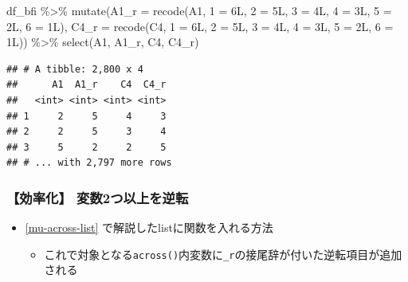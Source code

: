 \documentclass[
  xelatex,ja=standard, b5paper]{bxjsbook}
\newenvironment{Shaded}{\begin{snugshade}}{\end{snugshade}}
\newcommand{\AttributeTok}[1]{\textcolor[rgb]{0.77,0.63,0.00}{#1}}
\newcommand{\FunctionTok}[1]{\textcolor[rgb]{0.00,0.00,0.00}{#1}}
\newcommand{\NormalTok}[1]{#1}
\newcommand{\OtherTok}[1]{\textcolor[rgb]{0.56,0.35,0.01}{#1}}
\newcommand{\SpecialCharTok}[1]{\textcolor[rgb]{0.00,0.00,0.00}{#1}}
\newcommand{\StringTok}[1]{\textcolor[rgb]{0.31,0.60,0.02}{#1}}
\providecommand{\tightlist}{%
  \setlength{\itemsep}{0pt}\setlength{\parskip}{0pt}}
\begin{document}
\begin{Shaded}
\begin{Highlighting}[]
\NormalTok{df\_bfi }\SpecialCharTok{\%\textgreater{}\%} 
  \FunctionTok{mutate}\NormalTok{(}\AttributeTok{A1\_r =} \FunctionTok{recode}\NormalTok{(A1, }\StringTok{\textasciigrave{}}\AttributeTok{1}\StringTok{\textasciigrave{}} \OtherTok{=}\NormalTok{ 6L, }\StringTok{\textasciigrave{}}\AttributeTok{2}\StringTok{\textasciigrave{}} \OtherTok{=}\NormalTok{ 5L, }\StringTok{\textasciigrave{}}\AttributeTok{3}\StringTok{\textasciigrave{}} \OtherTok{=}\NormalTok{ 4L, }
                           \StringTok{\textasciigrave{}}\AttributeTok{4}\StringTok{\textasciigrave{}} \OtherTok{=}\NormalTok{ 3L, }\StringTok{\textasciigrave{}}\AttributeTok{5}\StringTok{\textasciigrave{}} \OtherTok{=}\NormalTok{ 2L, }\StringTok{\textasciigrave{}}\AttributeTok{6}\StringTok{\textasciigrave{}} \OtherTok{=}\NormalTok{ 1L),}
         \AttributeTok{C4\_r =} \FunctionTok{recode}\NormalTok{(C4, }\StringTok{\textasciigrave{}}\AttributeTok{1}\StringTok{\textasciigrave{}} \OtherTok{=}\NormalTok{ 6L, }\StringTok{\textasciigrave{}}\AttributeTok{2}\StringTok{\textasciigrave{}} \OtherTok{=}\NormalTok{ 5L, }\StringTok{\textasciigrave{}}\AttributeTok{3}\StringTok{\textasciigrave{}} \OtherTok{=}\NormalTok{ 4L, }
                           \StringTok{\textasciigrave{}}\AttributeTok{4}\StringTok{\textasciigrave{}} \OtherTok{=}\NormalTok{ 3L, }\StringTok{\textasciigrave{}}\AttributeTok{5}\StringTok{\textasciigrave{}} \OtherTok{=}\NormalTok{ 2L, }\StringTok{\textasciigrave{}}\AttributeTok{6}\StringTok{\textasciigrave{}} \OtherTok{=}\NormalTok{ 1L)) }\SpecialCharTok{\%\textgreater{}\%} 
  \FunctionTok{select}\NormalTok{(A1, A1\_r, C4, C4\_r)}
\end{Highlighting}
\end{Shaded}

\begin{verbatim}
## # A tibble: 2,800 x 4
##      A1  A1_r    C4  C4_r
##   <int> <int> <int> <int>
## 1     2     5     4     3
## 2     2     5     3     4
## 3     5     2     2     5
## # ... with 2,797 more rows
\end{verbatim}

\hypertarget{mu-rev-recode2ef}{%
\subsubsection{【効率化】 変数2つ以上を逆転}\label{mu-rev-recode2ef}}

\begin{itemize}
\tightlist
\item
  \ref{mu-across-list} で解説したlistに関数を入れる方法

  \begin{itemize}
  \tightlist
  \item
    これで対象となる\texttt{across()}内変数に\texttt{\_r}の接尾辞が付いた逆転項目が追加される
  \end{itemize}
\end{itemize}
\end{document}

